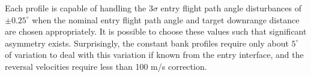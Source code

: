 \documentclass[]{article}
\begin{document}
Each profile is capable of handling the $3\sigma$ entry flight path angle disturbances of $\pm 0.25^\circ$ when the nominal entry flight path angle and target downrange distance are chosen appropriately. It is possible to choose these values such that significant asymmetry exists. Surprisingly, the constant bank profiles require only about $5^\circ$ of variation to deal with this variation if known from the entry interface, and the reversal velocities require less than 100 m/s correction. 




%
%
%
%
%
%
\end{document}
